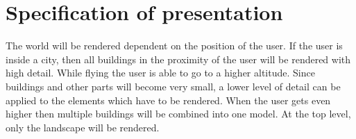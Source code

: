 \section{Specification of presentation}
\label{sec:SpecificationOfPresentation}
The world will be rendered dependent on the position of the user. If the user is inside a city, then all buildings in the proximity of the user will be rendered with high detail. While flying the user is able to go to a higher altitude. Since buildings and other parts will become very small, a lower level of detail can be applied to the elements which have to be rendered. When the user gets even higher then multiple buildings will be combined into one model. At the top level, only the landscape will be rendered. 